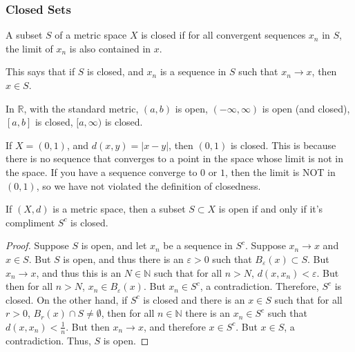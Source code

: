 \documentclass[crop=false,class=article,oneside]{standalone}
\begin{document}
        \subsubsection{Closed Sets}
            \begin{definition}
                A subset $S$ of a metric space $X$
                is closed if for all
                convergent sequences $x_{n}$
                in $S$, the limit of $x_{n}$ is also
                contained in $x$.
            \end{definition}
            This says that if $S$ is closed, and
            $x_{n}$ is a sequence in $S$ such
            that $x_{n}\rightarrow{x}$, then
            $x\in{S}$.
            \begin{example}
                In $\mathbb{R}$, with the standard
                metric, $(a,b)$ is open,
                $(-\infty,\infty)$ is open (and closed),
                $[a,b]$ is closed,
                $[a,\infty)$ is closed.
            \end{example}
            \begin{example}
                If $X=(0,1)$, and
                $d(x,y)=|x-y|$, then
                $(0,1)$ is closed. This is because
                there is no sequence that converges
                to a point in the space whose limit
                is not in the space. If you have a sequence
                converge to $0$ or $1$, then the
                limit is NOT in $(0,1)$, so we have not
                violated the definition of closedness.
            \end{example}
            \begin{theorem}
                If $(X,d)$ is a metric space,
                then a subset $S\subset{X}$ is open
                if and only if it's compliment $S^{c}$
                is closed.
            \end{theorem}
            \begin{proof}
                Suppose $S$ is open, and let
                $x_{n}$ be a sequence in $S^{c}$.
                Suppose $x_{n}\rightarrow{x}$ and
                $x\in{S}$. But $S$ is open, and thus
                there is an $\varepsilon>0$ such that
                $B_{\varepsilon}(x)\subset{S}$.
                But $x_{n}\rightarrow{x}$, and thus
                this is an $N\in\mathbb{N}$ such that
                for all $n>N$, $d(x,x_{n})<\varepsilon$.
                But then for all $n>N$,
                $x_{n}\in{B_{\varepsilon}(x)}$. But
                $x_{n}\in{S^{c}}$, a contradiction.
                Therefore, $S^{c}$ is closed. On the
                other hand, if $S^{c}$ is closed
                and there is an $x\in{S}$ such that
                for all $r>0$,
                $B_{r}(x)\cap{S}\ne\emptyset$, then
                for all $n\in\mathbb{N}$ there is
                an $x_{n}\in{S^{c}}$ such that
                $d(x,x_{n})<\frac{1}{n}$. But then
                $x_{n}\rightarrow{x}$, and therefore
                $x\in{S^{c}}$. But $x\in{S}$,
                a contradiction. Thus, $S$ is open.
            \end{proof}
\end{document}

